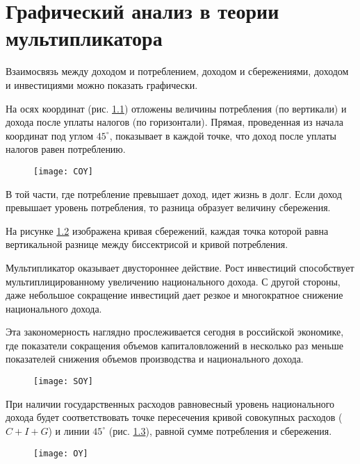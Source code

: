 \pagebreak %

\chapter{Графический анализ в теории мультипликатора}

Взаимосвязь между доходом и потреблением, доходом и сбережениями, доходом и
инвестициями можно показать графически.

На осях координат (рис. \ref{pic_COY}) отложены величины потребления (по
вертикали) и дохода после уплаты налогов (по горизонтали). Прямая, проведенная
из начала координат под углом \( 45^\circ \), показывает в каждой точке, что
доход после уплаты налогов равен потреблению.

\begin{figure}[h!]
    \centering
    \texttt{[image: COY]}
    \caption{}
    \label{pic_COY}
\end{figure}

В той части, где потребление превышает доход, идет жизнь в долг. Если доход
превышает уровень потребления, то разница образует величину сбережения.

На рисунке \ref{pic_SOY} изображена кривая сбережений, каждая точка которой
равна вертикальной разнице между биссектрисой и кривой потребления.
 
Мультипликатор оказывает двустороннее действие. Рост инвестиций способствует
мультиплицированному увеличению национального дохода. С другой стороны, даже
небольшое сокращение инвестиций дает резкое и многократное снижение
национального дохода.

Эта закономерность наглядно прослеживается сегодня в российской экономике, где
показатели сокращения объемов капиталовложений в несколько раз меньше
показателей снижения объемов производства и национального дохода.

\begin{figure}[h!]
    \centering
    \texttt{[image: SOY]}
    \caption{}
    \label{pic_SOY}
\end{figure}
 
При наличии государственных расходов равновесный уровень национального дохода
будет соответствовать точке пересечения кривой совокупных расходов
(\( C + I + G \)) и линии \( 45^\circ \) (рис. \ref{pic_OY}), равной сумме
потребления и сбережения.

\begin{figure}[h!]
    \centering
    \texttt{[image: OY]}
    \caption{}
    \label{pic_OY}
\end{figure}

